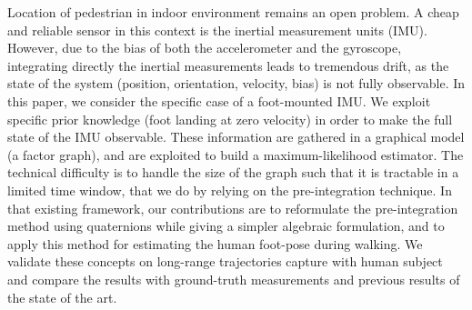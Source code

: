 %
%
Location of pedestrian in indoor environment remains an open problem.
A cheap and reliable sensor in this context is the inertial measurement units (IMU).
However, due to the bias of both the accelerometer and the gyroscope, integrating directly the inertial measurements leads to tremendous drift, as the state of the system (position, orientation, velocity, bias) is not fully observable. 
In this paper, we consider the specific case of a foot-mounted IMU.
We exploit specific prior knowledge (foot landing at zero velocity) in order to make the full state of the IMU observable.
These information are gathered in a graphical model (a factor graph), and are exploited to build a maximum-likelihood estimator.
The technical difficulty is to handle the size of the graph such that it is tractable in a limited time window, that we do by relying on the pre-integration technique.
In that existing framework, our contributions are to reformulate the pre-integration method using quaternions while giving a simpler algebraic formulation, and to apply this method for estimating the human foot-pose during walking.
We validate these concepts on long-range trajectories capture with human subject and compare the results with ground-truth measurements and previous results of the state of the art.



